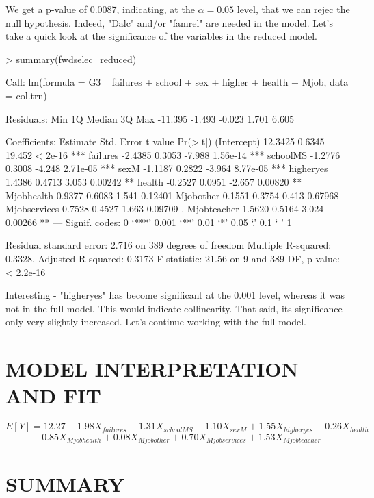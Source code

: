 \documentclass{article}
\begin{document}
We get a p-value of 0.0087, indicating, at the $\alpha=0.05$ level, that we can rejec the null hypothesis. Indeed, "Dalc" and/or "famrel" are needed in the model. Let's take a quick look at the significance of the variables in the reduced model.

\begin{Schunk}
\begin{Sinput}
> summary(fwdselec_reduced)
\end{Sinput}
\begin{Soutput}
Call:
lm(formula = G3 ~ failures + school + sex + higher + health + 
    Mjob, data = col.trn)

Residuals:
    Min      1Q  Median      3Q     Max 
-11.395  -1.493  -0.023   1.701   6.605 

Coefficients:
             Estimate Std. Error t value Pr(>|t|)    
(Intercept)   12.3425     0.6345  19.452  < 2e-16 ***
failures      -2.4385     0.3053  -7.988 1.56e-14 ***
schoolMS      -1.2776     0.3008  -4.248 2.71e-05 ***
sexM          -1.1187     0.2822  -3.964 8.77e-05 ***
higheryes      1.4386     0.4713   3.053  0.00242 ** 
health        -0.2527     0.0951  -2.657  0.00820 ** 
Mjobhealth     0.9377     0.6083   1.541  0.12401    
Mjobother      0.1551     0.3754   0.413  0.67968    
Mjobservices   0.7528     0.4527   1.663  0.09709 .  
Mjobteacher    1.5620     0.5164   3.024  0.00266 ** 
---
Signif. codes:  0 ‘***’ 0.001 ‘**’ 0.01 ‘*’ 0.05 ‘.’ 0.1 ‘ ’ 1

Residual standard error: 2.716 on 389 degrees of freedom
Multiple R-squared:  0.3328,	Adjusted R-squared:  0.3173 
F-statistic: 21.56 on 9 and 389 DF,  p-value: < 2.2e-16
\end{Soutput}
\end{Schunk}

Interesting - "higheryes" has become significant at the 0.001 level, whereas it was not in the full model. This would indicate collinearity. That said, its significance only very slightly increased. Let's continue working with the full model.

\section{MODEL INTERPRETATION AND FIT}


$$E[Y]=12.27-1.98X_{failures}-1.31X_{schoolMS}-1.10X_{sexM}+1.55X_{higheryes}-0.26X_{health}$$
$$+0.85X_{Mjobhealth}+0.08X_{Mjobother}+0.70X_{Mjobservices}+1.53X_{Mjobteacher} $$

\section{SUMMARY}
\end{document}
